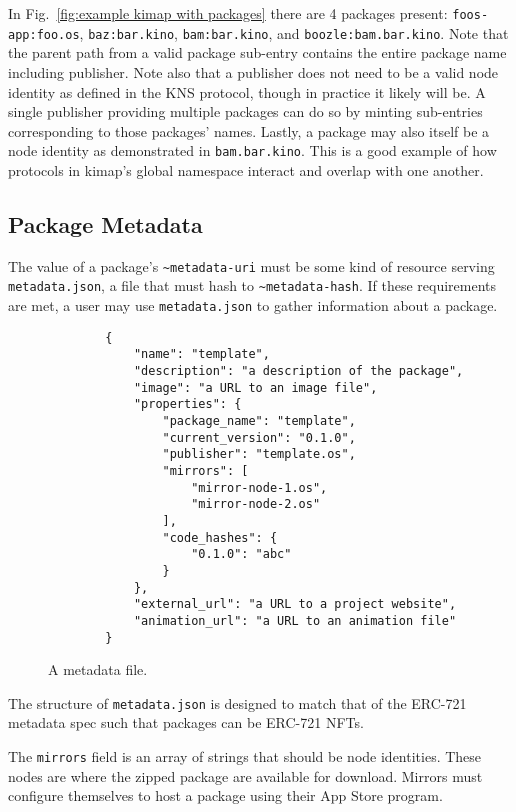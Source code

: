 \documentclass[runningheads]{llncs}
\begin{document}
In Fig.~\ref{fig:example kimap with packages} there are 4 packages present: \verb|foos-app:foo.os|, \verb|baz:bar.kino|, \verb|bam:bar.kino|, and \verb|boozle:bam.bar.kino|.
Note that the parent path from a valid package sub-entry contains the entire package name including publisher.
Note also that a publisher does not need to be a valid node identity as defined in the KNS protocol, though in practice it likely will be.
A single publisher providing multiple packages can do so by minting sub-entries corresponding to those packages' names.
Lastly, a package may also itself be a node identity as demonstrated in \verb|bam.bar.kino|.
This is a good example of how protocols in kimap's global namespace interact and overlap with one another.

\subsection{Package Metadata}
\label{sec:packagemanagermetadata}

The value of a package's \verb|~metadata-uri| must be some kind of resource serving \verb|metadata.json|, a file that must hash to \verb|~metadata-hash|.
If these requirements are met, a user may use \verb|metadata.json| to gather information about a package.

\begin{figure}[H]
    \centering
    \begin{lstlisting}
        {
            "name": "template",
            "description": "a description of the package",
            "image": "a URL to an image file",
            "properties": {
                "package_name": "template",
                "current_version": "0.1.0",
                "publisher": "template.os",
                "mirrors": [
                    "mirror-node-1.os",
                    "mirror-node-2.os"
                ],
                "code_hashes": {
                    "0.1.0": "abc"
                }
            },
            "external_url": "a URL to a project website",
            "animation_url": "a URL to an animation file"
        }
    \end{lstlisting}
    \caption{A metadata file.}
    \label{fig:example metadata.json}
\end{figure}

The structure of \verb|metadata.json| is designed to match that of the ERC-721 metadata spec such that packages can be ERC-721 NFTs.

The \verb|mirrors| field is an array of strings that should be node identities.
These nodes are where the zipped package are available for download.
Mirrors must configure themselves to host a package using their App Store program.
\end{document}
